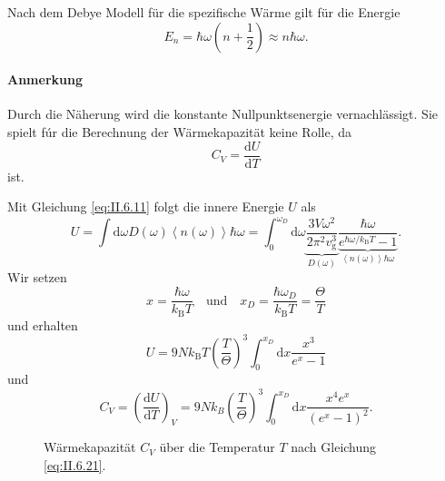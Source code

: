 \setcounter{section}{6}
\setcounter{subsection}{4}
\setcounter{equation}{17}

	Nach dem Debye Modell für die spezifische Wärme gilt für die Energie
	\begin{equation}
		\label{eq:II.6.18}
		E_{n} = \hbar  \omega \left( n + \frac{1}{2} \right) \approx n \hbar  \omega.
	\end{equation}	

\paragraph{Anmerkung} Durch die Näherung wird die konstante Nullpunktsenergie vernachlässigt. Sie spielt fúr die Berechnung der Wärmekapazität keine Rolle, da
	$$
	C_{V} = \frac{\mathrm{d}U}{\mathrm{d}T} 
	$$ 
	ist.

	Mit Gleichung \eqref{eq:II.6.11} folgt die innere Energie $U$ als
	\begin{equation}
		\label{eq:II.6.19}
		U = \int \mathrm{d} \omega D(\omega) \left< n(\omega) \right> \hbar  \omega = \int_{0}^{\omega_{D}} \mathrm{d} \omega \underbrace{ \frac{3 V \omega^2}{2 \pi^2 v_{\mathrm{g}}^3}}_{D(\omega)} \underbrace{ \frac{\hbar  \omega}{e^{\hbar  \omega /k_{\mathrm{B}} T} - 1}}_{\left<n(\omega) \right> \hbar  \omega}.
	\end{equation}
	Wir setzen
	$$
	x = \frac{\hbar  \omega}{k_{\mathrm{B}}T} \quad \text{und}\quad x_{D} = \frac{\hbar \omega_{D}}{k_{\mathrm{B}}T} = \frac{\Theta}{T}	
	$$ 
	und erhalten
	\begin{equation}
		\label{eq:II.6.20}
		U = 9 N k_{\mathrm{B}}T \left( \frac{T}{\Theta} \right) ^3 
		\int_{0}^{x_{D}} \mathrm{d}x \frac{x^3}{e^{x} -1}
	\end{equation}
	und
	\begin{equation}
		\label{eq:II.6.21}
		C_{V} = \left( \frac{\mathrm{d}U}{\mathrm{d}T}\right)_{V} = 9Nk_{B} \left( \frac{T}{\Theta} \right) ^3 \int_{0}^{x_{D}} \mathrm{d} x \frac{x^4 e^{x}}{\left( e^{x} -1  \right) ^2}.
	\end{equation}	

	\begin{figure}[H]
		\centering
		\caption{Wärmekapazität $C_V$ über die Temperatur $T$ nach Gleichung \eqref{eq:II.6.21}.}
		\label{fig:vl24_abbildung_1}
	\end{figure}


